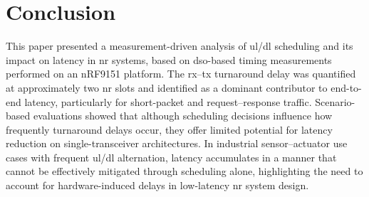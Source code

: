 \documentclass[conference]{IEEEtran}
\begin{document}
\section{Conclusion}
This paper presented a measurement-driven analysis of \gls{ul}/\gls{dl} scheduling and its impact on latency in \gls{nr} systems, based on \gls{dso}-based timing measurements performed on an nRF9151 platform. The \gls{rx}--\gls{tx} turnaround delay was quantified at approximately two \gls{nr} slots and identified as a dominant contributor to end-to-end latency, particularly for short-packet and request--response traffic. Scenario-based evaluations showed that although scheduling decisions influence how frequently turnaround delays occur, they offer limited potential for latency reduction on single-transceiver architectures. In industrial sensor--actuator use cases with frequent \gls{ul}/\gls{dl} alternation, latency accumulates in a manner that cannot be effectively mitigated through scheduling alone, highlighting the need to account for hardware-induced delays in low-latency \gls{nr} system design.





%

\end{document}
